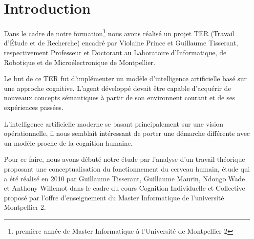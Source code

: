 \chapter*{Introduction}
Dans le cadre de notre formation\footnote{première année de Master Informatique à l'Université de Montpellier 2} nous avons réalisé un projet TER (Travail d'Étude et de Recherche) encadré par \mbox{Violaine} \mbox{Prince} et \mbox{Guillaume} \mbox{Tisserant}, respectivement Professeur et Doctorant au Laboratoire d'Informatique, de Robotique et de Microélectronique de Montpellier.

Le but de ce TER fut d'implémenter un modèle d'intelligence artificielle basé sur une approche cognitive. L'agent développé devait être capable d'acquérir de nouveaux concepts sémantiques à partir de son environnent courant et de ses expériences passées.

L'intelligence artificielle moderne se basant principalement sur une vision opérationnelle, il nous semblait intéressant de porter une démarche différente avec un modèle proche de la cognition humaine.

Pour ce faire, nous avons débuté notre étude par l'analyse d'un travail théorique proposant une conceptualisation du fonctionnement du cerveau humain, étude qui a été réalisé en 2010 par \mbox{Guillaume} \mbox{Tisserant}, \mbox{Guillaume} \mbox{Maurin}, \mbox{Ndongo} \mbox{Wade} et \mbox{Anthony} \mbox{Willemot} dans le cadre du cours \og Cognition Individuelle et Collective\fg{} proposé par l'offre d'enseignement du Master Informatique de l'université Montpellier 2.
